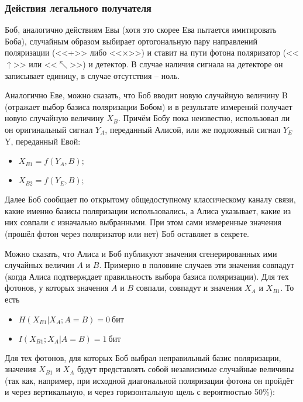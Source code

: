 \subsubsection{Действия легального получателя}

Боб, аналогично действиям Евы (хотя это скорее Ева пытается имитировать Боба), случайным образом выбирает ортогональную пару направлений поляризации (<<+>> либо <<×>>) и ставит на пути фотона поляризатор (<<$\uparrow$>> или <<$\nwarrow$>>) и детектор. В случае наличия сигнала на детекторе он записывает единицу, в случае отсутствия – ноль.

Аналогично Еве, можно сказать, что Боб вводит новую случайную величину B (отражает выбор базиса поляризации Бобом) и в результате измерений получает новую случайную величину $X_B$. Причём Бобу пока неизвестно, использовал ли он оригинальный сигнал $Y_A$, переданный Алисой, или же подложный сигнал $Y_E$Y, переданный Евой:

\begin{itemize}
	\item $X_{B1} = f \left( Y_A, B \right);$
	\item $X_{B2} = f \left( Y_E, B \right);$
\end{itemize}

Далее Боб сообщает по открытому общедоступному классическому каналу связи, какие именно базисы поляризации использовались, а Алиса указывает, какие из них совпали с изначально выбранными. При этом сами измеренные значения (прошёл фотон через поляризатор или нет) Боб оставляет в секрете.

Можно сказать, что Алиса и Боб публикуют значения сгенерированных ими случайных величин $A$ и $B$. Примерно в половине случаев эти значения совпадут (когда Алиса подтверждает правильность выбора базиса поляризации). Для тех фотонов, у которых значения $A$ и $B$ совпали, совпадут и значения $X_A$ и $X_{B1}$. То есть

\begin{itemize}
	\item $H \left( X_{B1} | X_A; A = B \right) = 0~\text{бит}$
	\item $I \left( X_{B1} ; X_A | A = B \right) = 1~\text{бит}$
\end{itemize}

Для тех фотонов, для которых Боб выбрал неправильный базис поляризации, значения $X_{B1}$ и $X_{A}$ будут представлять собой независимые случайные величины (так как, например, при исходной диагональной поляризации фотона он пройдёт и через вертикальную, и через горизонтальную щель с вероятностью 50\%):

